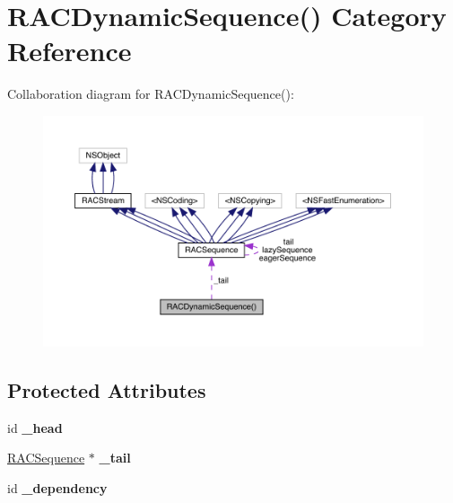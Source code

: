 \hypertarget{category_r_a_c_dynamic_sequence_07_08}{}\section{R\+A\+C\+Dynamic\+Sequence() Category Reference}
\label{category_r_a_c_dynamic_sequence_07_08}


Collaboration diagram for R\+A\+C\+Dynamic\+Sequence()\+:\nopagebreak
\begin{figure}[H]
\begin{center}
\leavevmode
\includegraphics[width=350pt]{category_r_a_c_dynamic_sequence_07_08__coll__graph}
\end{center}
\end{figure}
\subsection*{Protected Attributes}
\begin{DoxyCompactItemize}
\item 
\mbox{\label{category_r_a_c_dynamic_sequence_07_08_a8fca513ceb29619802854aca2d55243e}} 
id {\bfseries \+\_\+head}
\item 
\mbox{\label{category_r_a_c_dynamic_sequence_07_08_a126696ad98454204e73e8dfe460e56f1}} 
\mbox{\hyperlink{interface_r_a_c_sequence}{R\+A\+C\+Sequence}} $\ast$ {\bfseries \+\_\+tail}
\item 
\mbox{\label{category_r_a_c_dynamic_sequence_07_08_ae5d3d1d93bf258ba171ee6dcb6db521d}} 
id {\bfseries \+\_\+dependency}
\end{DoxyCompactItemize}
